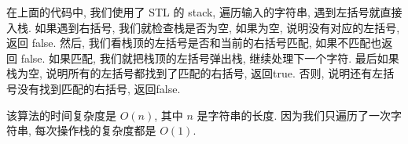 \documentclass[a4paper]{ctexart}
\theoremstyle{definition}
\theoremstyle{definition}
\begin{document}
在上面的代码中, 我们使用了 STL 的 stack, 遍历输入的字符串, 遇到左括号就直接入栈. 
如果遇到右括号, 我们就检查栈是否为空, 如果为空, 说明没有对应的左括号, 返回 false. 
然后, 我们看栈顶的左括号是否和当前的右括号匹配, 如果不匹配也返回 false. 如果匹配, 
我们就把栈顶的左括号弹出栈, 继续处理下一个字符. 最后如果栈为空, 
说明所有的左括号都找到了匹配的右括号, 返回true. 否则, 说明还有左括号没有找到匹配的右括号, 
返回false. 

该算法的时间复杂度是 $O(n)$, 其中 $n$ 是字符串的长度. 因为我们只遍历了一次字符串, 
每次操作栈的复杂度都是 $O(1)$.






\end{document}
